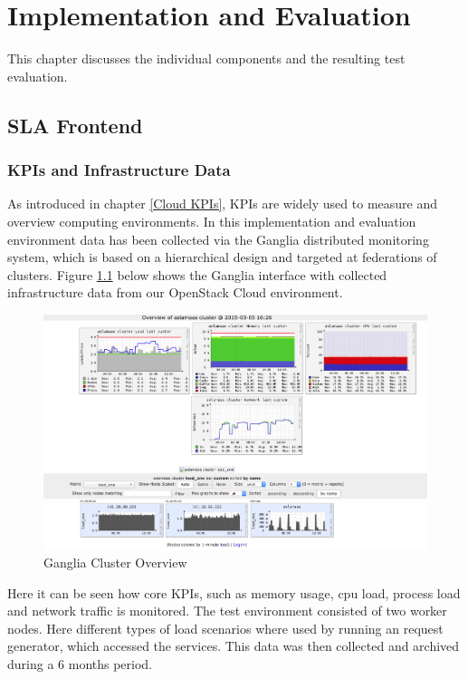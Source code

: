 
\chapter{Implementation and Evaluation} %
\label{Evaluation} %
This chapter discusses the individual components and the resulting test evaluation.

\section{SLA Frontend}

\subsection{KPIs and Infrastructure Data}
As introduced in chapter \ref{Cloud KPIs}, KPIs are widely used to measure and overview computing environments. In this implementation and evaluation environment data has been collected via the Ganglia  \cite{Ganglia} distributed monitoring system, which is based on a hierarchical design and targeted at federations of clusters. Figure \ref{fig:monidata} below shows the Ganglia interface with collected infrastructure data from our OpenStack Cloud environment.

\begin{figure}[ht]
	\centering
	\includegraphics[width=0.9\linewidth]{chapters/chapter5/fig/monidata_cluster}
	\caption{Ganglia Cluster Overview}
	\label{fig:monidata}
\end{figure}

Here it can be seen how core KPIs, such as memory usage, cpu load, process load and network traffic is monitored. The test environment consisted of two worker nodes. Here different types of load scenarios where used by running an request generator, which accessed the services. This data was then collected and archived during a 6 months period.

